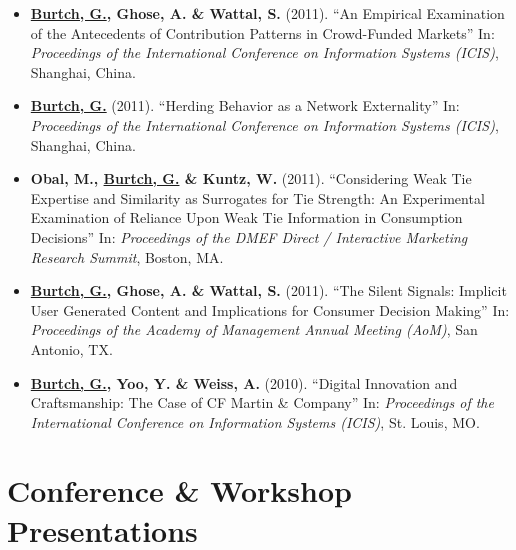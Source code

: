 \documentclass[10.5pt,letterpaper,sans]{moderncv}        %
\begin{document}
\begin{itemize}
\item \textbf{\underline{Burtch, G.}, Ghose, A. \& Wattal, S.} (2011). ``An Empirical Examination of the Antecedents of Contribution Patterns in Crowd-Funded Markets'' In: \textit{Proceedings of the International Conference on Information Systems (ICIS)}, Shanghai, China.

\item \textbf{\underline{Burtch, G.}} (2011). ``Herding Behavior as a Network Externality'' In: \textit{Proceedings of the International Conference on Information Systems (ICIS)}, Shanghai, China.

\item \textbf{Obal, M., \underline{Burtch, G.} \& Kuntz, W.} (2011). ``Considering Weak Tie Expertise and Similarity as Surrogates for Tie Strength: An Experimental Examination of Reliance Upon Weak Tie Information in Consumption Decisions'' In: \textit{Proceedings of the DMEF Direct / Interactive Marketing Research Summit}, Boston, MA.

\item \textbf{\underline{Burtch, G.}, Ghose, A. \& Wattal, S.} (2011). ``The Silent Signals: Implicit User Generated Content and Implications for Consumer Decision Making'' In: \textit{Proceedings of the Academy of Management Annual Meeting (AoM)}, San Antonio, TX.

\item \textbf{\underline{Burtch, G.}, Yoo, Y. \& Weiss, A.} (2010). ``Digital Innovation and Craftsmanship: The Case of CF Martin \& Company'' In: \textit{Proceedings of the International Conference on Information Systems (ICIS)}, St. Louis, MO.

\end{itemize}

 
\section{Conference \& Workshop Presentations}
\end{document}
